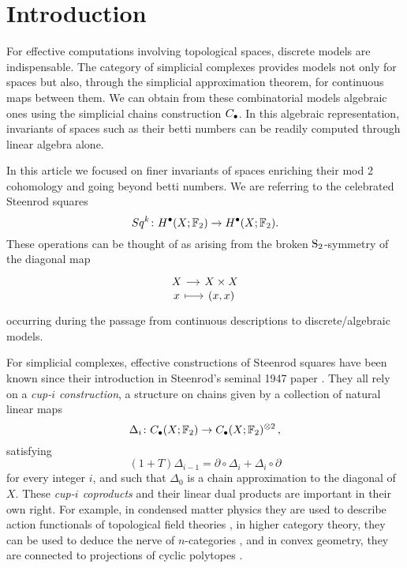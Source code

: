 
\section{Introduction}

For effective computations involving topological spaces, discrete models are indispensable.
The category of simplicial complexes provides models not only for spaces but also, through the simplicial approximation theorem, for continuous maps between them.
We can obtain from these combinatorial models algebraic ones using the simplicial chains construction $\chains$.
In this algebraic representation, invariants of spaces such as their betti numbers can be readily computed through linear algebra alone.

In this article we focused on finer invariants of spaces enriching their mod 2 cohomology and going beyond betti numbers.
We are referring to the celebrated Steenrod squares
\begin{equation*}
Sq^k \colon H^\bullet(X; \F_2) \to H^\bullet(X; \F_2).
\end{equation*}
These operations can be thought of as arising from the broken $\S_2$-symmetry of the diagonal map
\begin{equation*}
\begin{tikzcd}[column sep=small, row sep=-3pt]
X \arrow[r] & X \times X \\
x \arrow[r, mapsto] & (x,x)
\end{tikzcd}
\end{equation*}
occurring during the passage from continuous descriptions to discrete/algebraic models.

For simplicial complexes, effective constructions of Steenrod squares have been known since their introduction in Steenrod's seminal 1947 paper \cite{steenrod47}.
They all rely on a \textit{cup-$i$ construction}, a structure on chains given by a collection of natural linear maps
\begin{equation*}
\Delta_i \colon \chains(X; \F_2)  \to \chains(X; \F_2)^{\otimes 2}\,,
\end{equation*}
satisfying
\begin{equation*}
(1+T) \Delta_{i-1} = \partial \circ \Delta_i + \Delta_i \circ \partial
\end{equation*}
for every integer $i$, and such that $\Delta_0$ is a chain approximation to the diagonal of $X$.
These \textit{cup-$i$ coproducts} and their linear dual products are important in their own right.
For example, in condensed matter physics they are used to describe action functionals of topological field theories \cite{gaiotto2016spin, bhardwaj2017state, kapustin2017fermionic}, in higher category theory, they can be used to deduce the nerve of $n$-categories \cite{medina2020globular}, and in convex geometry, they are connected to projections of cyclic polytopes \cite{kapranov1991combinatorial}.


